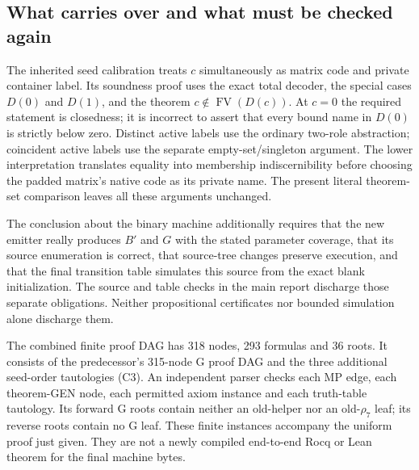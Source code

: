 \subsection{What carries over and what must be checked again}

The inherited seed calibration treats $c$ simultaneously as matrix code
and private container label.  Its soundness proof uses the exact total
decoder, the special cases $D(0)$ and $D(1)$, and the theorem
$c\notin\operatorname{FV}(D(c))$.  At $c=0$ the required statement
is closedness; it is incorrect to assert that every bound name in
$D(0)$ is strictly below zero.  Distinct active labels use the ordinary
two-role abstraction; coincident active labels use the separate
empty-set/singleton argument.  The lower interpretation translates
equality into membership indiscernibility before choosing the padded
matrix's native code as its private name.  The present literal
theorem-set comparison leaves all these arguments unchanged.

The conclusion about the binary machine additionally requires that the
new emitter really produces $B'$ and $G$ with the stated parameter
coverage, that its source enumeration is correct, that source-tree
changes preserve execution, and that the final transition table
simulates this source from the exact blank initialization.  The source
and table checks in the main report discharge those separate
obligations.  Neither propositional certificates nor bounded simulation
alone discharge them.

The combined finite proof DAG has 318 nodes, 293 formulas and 36 roots.
It consists of the predecessor's 315-node G proof DAG and the three
additional seed-order tautologies (C3).  An independent parser checks
each MP edge, each theorem-GEN node, each permitted axiom instance and
each truth-table tautology.  Its forward G roots contain neither an
old-helper nor an old-$\rho_7$ leaf; its reverse roots contain no G leaf.
These finite instances accompany the uniform proof just given.  They
are not a newly compiled end-to-end Rocq or Lean theorem for the final
machine bytes.
